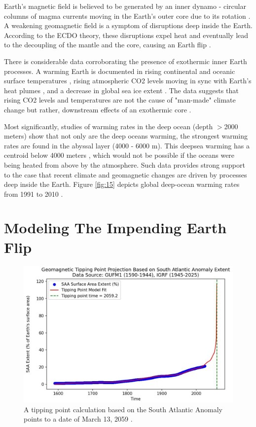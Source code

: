 \documentclass[10pt,twocolumn,letterpaper]{article}
\begin{document}
Earth's magnetic field is believed to be generated by an inner dynamo - circular columns of magma currents moving in the Earth's outer core due to its rotation \cite{123}. A weakening geomagnetic field is a symptom of disruptions deep inside the Earth. According to the ECDO theory, these disruptions expel heat and eventually lead to the decoupling of the mantle and the core, causing an Earth flip \cite{1}.

There is considerable data corroborating the presence of exothermic inner Earth processes. A warming Earth is documented in rising continental and oceanic surface temperatures \cite{127,128}, rising atmospheric CO2 levels moving in sync with Earth's heat plumes \cite{129,130}, and a decrease in global sea ice extent \cite{131}. The data suggests that rising CO2 levels and temperatures are not the cause of "man-made" climate change but rather, downstream effects of an exothermic core \cite{129}.

Most significantly, studies of warming rates in the deep ocean (depth $>$2000 meters) show that not only are the deep oceans warming, the strongest warming rates are found in the abyssal layer (4000 - 6000 m). This deepsea warming has a centroid below 4000 meters \cite{132,129}, which would not be possible if the oceans were being heated from above by the atmosphere. Such data provides strong support to the case that recent climate and geomagnetic changes are driven by processes deep inside the Earth. Figure \ref{fig:15} depicts global deep-ocean warming rates from 1991 to 2010 \cite{132}.

\section{Modeling The Impending Earth Flip}

\begin{figure}[t]
\begin{center}
   \includegraphics[width=1\linewidth]{saa-crop.jpeg}
\end{center}
   \caption{A tipping point calculation based on the South Atlantic Anomaly points to a date of March 13, 2059 \cite{125,126}.}
\label{fig:16}
\label{fig:onecol}
\end{figure}
\end{document}
